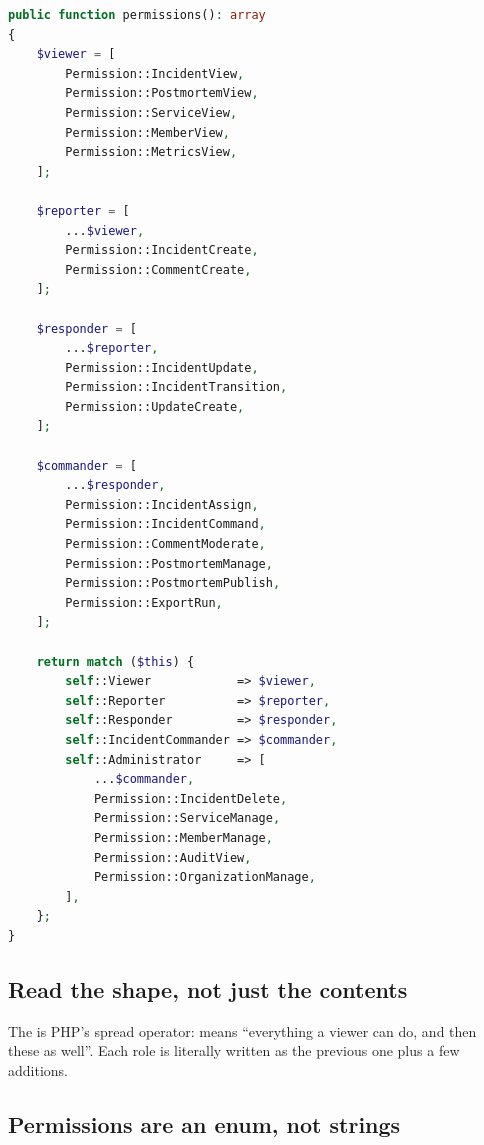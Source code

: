 \begin{lstlisting}[language=PHP]
public function permissions(): array
{
    $viewer = [
        Permission::IncidentView,
        Permission::PostmortemView,
        Permission::ServiceView,
        Permission::MemberView,
        Permission::MetricsView,
    ];

    $reporter = [
        ...$viewer,
        Permission::IncidentCreate,
        Permission::CommentCreate,
    ];

    $responder = [
        ...$reporter,
        Permission::IncidentUpdate,
        Permission::IncidentTransition,
        Permission::UpdateCreate,
    ];

    $commander = [
        ...$responder,
        Permission::IncidentAssign,
        Permission::IncidentCommand,
        Permission::CommentModerate,
        Permission::PostmortemManage,
        Permission::PostmortemPublish,
        Permission::ExportRun,
    ];

    return match ($this) {
        self::Viewer            => $viewer,
        self::Reporter          => $reporter,
        self::Responder         => $responder,
        self::IncidentCommander => $commander,
        self::Administrator     => [
            ...$commander,
            Permission::IncidentDelete,
            Permission::ServiceManage,
            Permission::MemberManage,
            Permission::AuditView,
            Permission::OrganizationManage,
        ],
    };
}
\end{lstlisting}

\subsection{Read the shape, not just the contents}

The  is PHP's spread operator:  means ``everything
a viewer can do, and then these as well''. Each role is literally written as the
previous one plus a few additions.


\subsection{Permissions are an enum, not strings}

